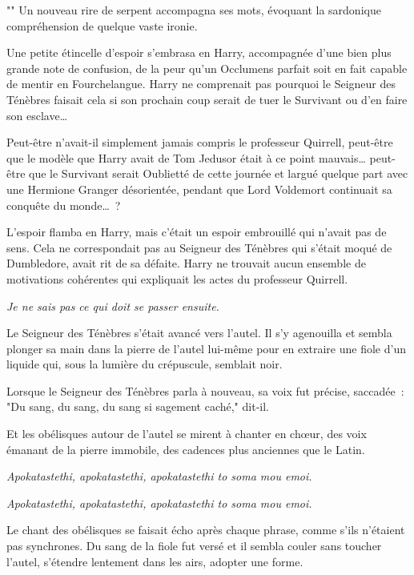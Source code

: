 "" Un nouveau rire de serpent accompagna ses mots, évoquant la sardonique compréhension de quelque vaste ironie.

Une petite étincelle d'espoir s'embrasa en Harry, accompagnée d'une bien plus grande note de confusion, de la peur qu'un Occlumens parfait soit en fait capable de mentir en Fourchelangue. Harry ne comprenait pas pourquoi le Seigneur des Ténèbres faisait cela si son prochain coup serait de tuer le Survivant ou d'en faire son esclave…

Peut-être n'avait-il simplement jamais compris le professeur Quirrell, peut-être que le modèle que Harry avait de Tom Jedusor était à ce point mauvais… peut-être que le Survivant serait Oublietté de cette journée et largué quelque part avec une Hermione Granger désorientée, pendant que Lord Voldemort continuait sa conquête du monde…~?

L'espoir flamba en Harry, mais c'était un espoir embrouillé qui n'avait pas de sens. Cela ne correspondait pas au Seigneur des Ténèbres qui s'était moqué de Dumbledore, avait rit de sa défaite. Harry ne trouvait aucun ensemble de motivations cohérentes qui expliquait les actes du professeur Quirrell.

\emph{Je ne sais pas ce qui doit se passer ensuite.}

Le Seigneur des Ténèbres s'était avancé vers l'autel. Il s'y agenouilla et sembla plonger sa main dans la pierre de l'autel lui-même pour en extraire une fiole d'un liquide qui, sous la lumière du crépuscule, semblait noir.

Lorsque le Seigneur des Ténèbres parla à nouveau, sa voix fut précise, saccadée~: "Du sang, du sang, du sang si sagement caché," dit-il.

Et les obélisques autour de l'autel se mirent à chanter en chœur, des voix émanant de la pierre immobile, des cadences plus anciennes que le Latin.

\emph{Apokatastethi, apokatastethi, apokatastethi to soma mou emoi.}

\emph{Apokatastethi, apokatastethi, apokatastethi to soma mou emoi.}

Le chant des obélisques se faisait écho après chaque phrase, comme s'ils n'étaient pas synchrones. Du sang de la fiole fut versé et il sembla couler sans toucher l'autel, s'étendre lentement dans les airs, adopter une forme.

